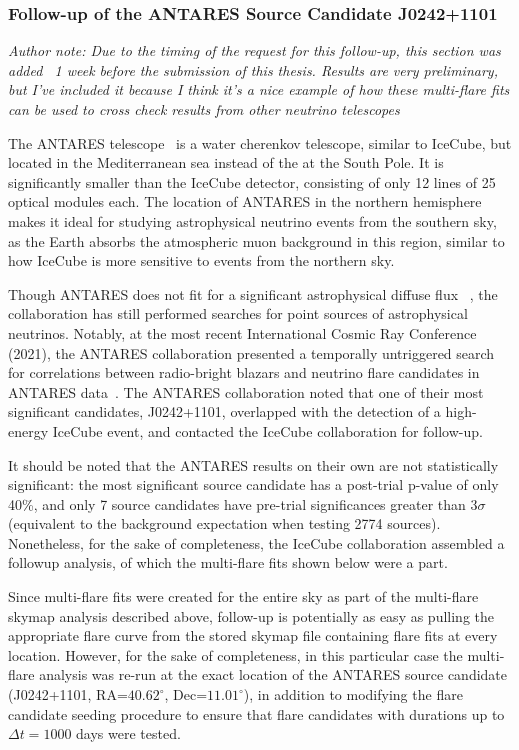 \subsubsection{Follow-up of the ANTARES Source Candidate J0242+1101}
\textit{Author note: Due to the timing of the request for this follow-up, this section was added ~1 week before the submission of this thesis. Results are very preliminary, but I've included it because I think it's a nice example of how these multi-flare fits can be used to cross check results from other neutrino telescopes}

The ANTARES telescope~\cite{antarescollaboration2011antares} is a water cherenkov telescope, similar to IceCube, but located in the Mediterranean sea instead of the at the South Pole. It is significantly smaller than the IceCube detector, consisting of only 12 lines of 25 optical modules each. The location of ANTARES in the northern hemisphere makes it ideal for studying astrophysical neutrino events from the southern sky, as the Earth absorbs the atmospheric muon background in this region, similar to how IceCube is more sensitive to events from the northern sky. 

Though ANTARES does not fit for a significant astrophysical diffuse flux ~\cite{Albert_2018}, the collaboration has still performed searches for point sources of astrophysical neutrinos. Notably, at the most recent International Cosmic Ray Conference (2021)\footnotemark, the ANTARES collaboration presented a temporally untriggered search for correlations between radio-bright blazars and neutrino flare candidates in ANTARES data~\cite{Illuminati:202198}. The ANTARES collaboration noted that one of their most significant candidates, J0242+1101, overlapped with the detection of a high-energy IceCube event, and contacted the IceCube collaboration for follow-up.

It should be noted that the ANTARES results on their own are not statistically significant: the most significant source candidate has a post-trial p-value of only 40\%, and only 7 source candidates have pre-trial significances greater than $3\sigma$ (equivalent to the background expectation when testing 2774 sources). Nonetheless, for the sake of completeness, the IceCube collaboration assembled a followup analysis, of which the multi-flare fits shown below were a part. 

Since multi-flare fits were created for the entire sky as part of the multi-flare skymap analysis described above, follow-up is potentially as easy as pulling the appropriate flare curve from the stored skymap file containing flare fits at every location. However, for the sake of completeness, in this particular case the multi-flare analysis was re-run at the exact location of the ANTARES source candidate (J0242+1101, RA=$40.62^{\circ}$, Dec=$11.01^{\circ}$), in addition to modifying the flare candidate seeding procedure to ensure that flare candidates with durations up to $\Delta t=1000$ days were tested.  

